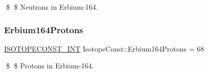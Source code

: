 \$ \$ Neutrons in Erbium-\/164. \mbox{\label{group___isotope_const-_erbium-_er164_ga0f5eef5c6837bc4a6505333a47aef85d}} 
\subsubsection{\texorpdfstring{Erbium164\+Protons}{Erbium164Protons}}
{\footnotesize\ttfamily \mbox{\hyperlink{group___isotope_const-_macros_ga5f18360b3e99483a35c32d789e62621c}{I\+S\+O\+T\+O\+P\+E\+C\+O\+N\+S\+T\+\_\+\+I\+NT}} Isotope\+Const\+::\+Erbium164\+Protons = 68}

\$ \$ Protons in Erbium-\/164. 